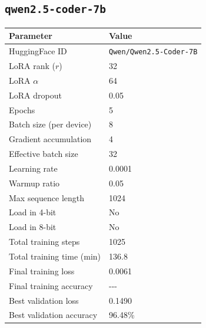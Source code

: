 \documentclass[11pt,a4paper]{article}
\begin{document}
\subsection{\texttt{qwen2.5-coder-7b}}

\begin{table}[H]
  \centering
  \begin{tabular}{ll}
    \toprule
    \textbf{Parameter}        & \textbf{Value}                 \\
    \midrule
    HuggingFace ID            & \texttt{Qwen/Qwen2.5-Coder-7B} \\
    LoRA rank ($r$)           & 32                             \\
    LoRA $\alpha$             & 64                             \\
    LoRA dropout              & 0.05                           \\
    Epochs                    & 5                              \\
    Batch size (per device)   & 8                              \\
    Gradient accumulation     & 4                              \\
    Effective batch size      & 32                             \\
    Learning rate             & 0.0001                         \\
    Warmup ratio              & 0.05                           \\
    Max sequence length       & 1024                           \\
    Load in 4-bit             & No                             \\
    Load in 8-bit             & No                             \\
    Total training steps      & 1025                           \\
    Total training time (min) & 136.8                          \\
    Final training loss       & 0.0061                         \\
    Final training accuracy   & {-}{-}{-}                      \\
    Best validation loss      & 0.1490                         \\
    Best validation accuracy  & 96.48\%                        \\
    \bottomrule
  \end{tabular}
\end{table}
\end{document}
